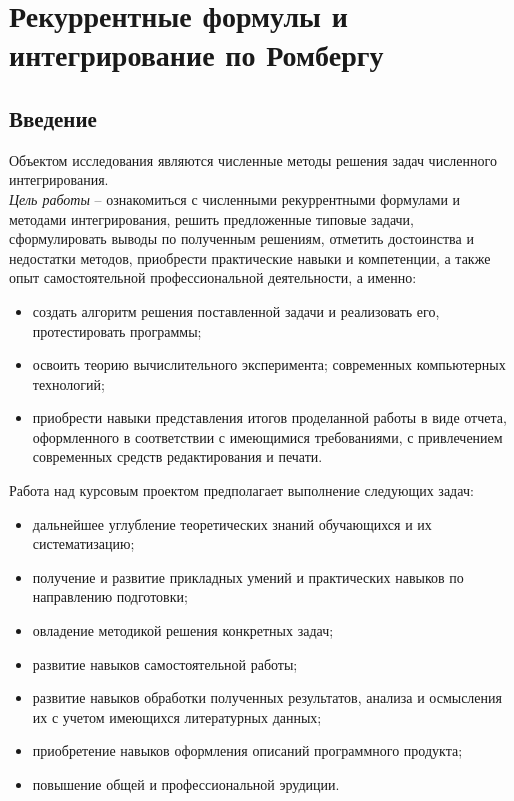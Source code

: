 \documentclass[14pt, titlepage, a4paper]{extarticle} %
\begin{document}

	\tableofcontents
	\pagebreak
	
	
	\section*{Рекуррентные формулы и интегрирование по Ромбергу}
	
	\subsection*{Введение}
	
	Объектом исследования являются численные методы решения задач численного интегрирования.\\
	\textit{Цель работы} – ознакомиться с численными рекуррентными формулами и методами интегрирования, решить предложенные типовые задачи, сформулировать выводы по полученным решениям, отметить достоинства и недостатки методов, приобрести практические навыки и компетенции, а также опыт самостоятельной профессиональной деятельности, а именно:
	\begin{itemize}
		\item создать алгоритм решения поставленной задачи и реализовать его, протестировать программы;
		\item освоить теорию вычислительного эксперимента; современных компьютерных технологий; 
		\item приобрести навыки представления итогов проделанной работы в виде отчета, оформленного в соответствии с имеющимися требованиями, с привлечением современных средств редактирования и печати.	
	\end{itemize}
	Работа над курсовым проектом предполагает выполнение следующих задач:
	\begin{itemize}
		\item дальнейшее углубление теоретических знаний обучающихся и их систематизацию;
		\item получение и развитие прикладных умений и практических навыков по направлению подготовки;
		\item овладение методикой решения конкретных задач;
		\item развитие навыков самостоятельной работы;
		\item развитие навыков обработки полученных результатов, анализа и осмысления их с учетом имеющихся литературных данных;
		\item приобретение навыков оформления описаний программного продукта;
		\item повышение общей и профессиональной эрудиции.
	\end{itemize}
\end{document}

